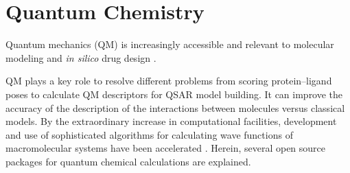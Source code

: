 \section{Quantum Chemistry}
Quantum mechanics (QM) is increasingly accessible and relevant to molecular modeling and \textit{in silico} drug design \cite{Vivo_2011}. 

QM plays a key role to resolve different problems from scoring protein–ligand poses to calculate QM descriptors for QSAR model building. It can improve the accuracy of the description of the interactions between molecules versus classical models. By the extraordinary increase in computational facilities, development and use of sophisticated algorithms for calculating wave functions of macromolecular systems have been accelerated \cite{Merz_2010}. Herein, several open source packages for quantum chemical calculations are explained.	 